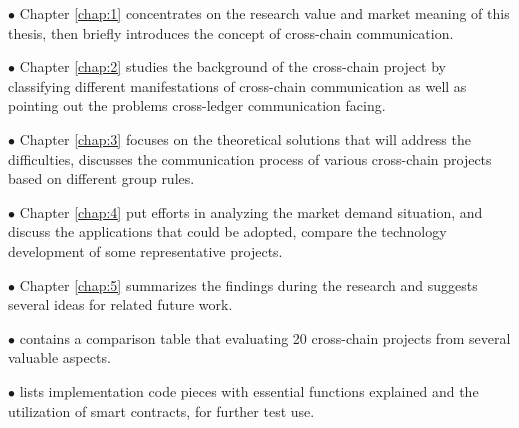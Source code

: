 $\bullet $ Chapter \ref{chap:1} concentrates on the research value and market meaning of this thesis, then briefly introduces the concept of cross-chain communication.

$\bullet $ Chapter \ref{chap:2} studies the background of the cross-chain project by classifying different manifestations of cross-chain communication as well as pointing out the problems cross-ledger communication facing.

$\bullet $ Chapter \ref{chap:3} focuses on the theoretical solutions that will address the difficulties, discusses the communication process of various cross-chain projects based on different group rules. 

$\bullet $ Chapter \ref{chap:4} put efforts in analyzing the market demand situation, and discuss the applications that could be adopted, compare the technology development of some representative projects.

$\bullet $ Chapter \ref{chap:5} summarizes the findings during the research and suggests several ideas for related future work.

$\bullet $  contains a comparison table that evaluating 20 cross-chain projects from several valuable aspects.

$\bullet $  lists implementation code pieces with essential functions explained and the utilization of smart contracts, for further test use.
  